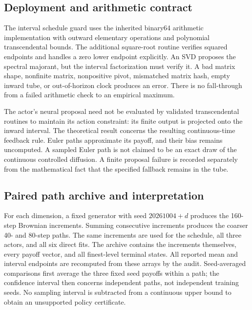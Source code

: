 \subsection{Deployment and arithmetic contract}
The interval schedule guard uses the inherited binary64 arithmetic implementation with outward elementary operations and polynomial transcendental bounds. The additional square-root routine verifies squared endpoints and handles a zero lower endpoint explicitly. An SVD proposes the spectral majorant, but the interval factorization must verify it. A bad matrix shape, nonfinite matrix, nonpositive pivot, mismatched matrix hash, empty inward tube, or out-of-horizon clock produces an error. There is no fall-through from a failed arithmetic check to an empirical maximum.

The actor's neural proposal need not be evaluated by validated transcendental routines to maintain its action constraint: its finite output is projected onto the inward interval. The theoretical result concerns the resulting continuous-time feedback rule. Euler paths approximate its payoff, and their bias remains uncomputed. A sampled Euler path is not claimed to be an exact draw of the continuous controlled diffusion. A finite proposal failure is recorded separately from the mathematical fact that the specified fallback remains in the tube.

\subsection{Paired path archive and interpretation}
For each dimension, a fixed generator with seed $20261004+d$ produces the 160-step Brownian increments. Summing consecutive increments produces the coarser 40- and 80-step paths. The same increments are used for the schedule, all three actors, and all six direct fits. The archive contains the increments themselves, every payoff vector, and all finest-level terminal states. All reported mean and interval endpoints are recomputed from these arrays by the audit. Seed-averaged comparisons first average the three fixed seed payoffs within a path; the confidence interval then concerns independent paths, not independent training seeds. No sampling interval is subtracted from a continuous upper bound to obtain an unsupported policy certificate.
